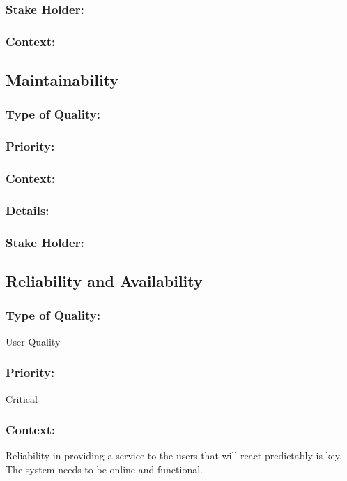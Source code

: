 \documentclass[11pt]{article}
\begin{document}
		\subsubsection{Stake Holder:}
			\textbf{}

		\subsubsection{Context:}
			\textbf{}
	\subsection{Maintainability}
		\subsubsection{Type of Quality:}
			\textbf{}
		
		\subsubsection{Priority:}
			\textbf{}

		\subsubsection{Context:}
			\textbf{}
		
		\subsubsection{Details:}
			\textbf{}
		
		\subsubsection{Stake Holder:}
			\textbf{}

	\subsection{Reliability and Availability}
		\subsubsection{Type of Quality:}
			\textbf{}User Quality
		
		\subsubsection{Priority:}
			\textbf{} Critical

		\subsubsection{Context:}
			\textbf{}Reliability in providing a service to the users that will react predictably is key. The system needs to be online and functional.
		
\end{document}
